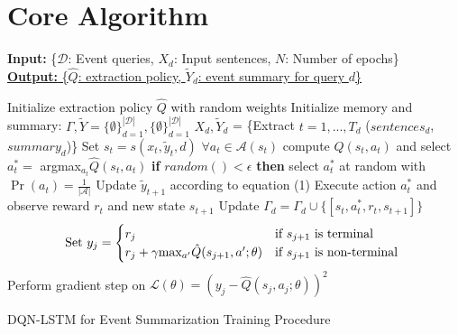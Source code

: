 \documentclass[]{beamer}
\begin{document}
\section{Core Algorithm}
\begin{frame}
\begin{algorithm}[H]
  \tiny
        \textbf{Input:} { \rm  \{$\mathcal{D}$: Event queries, $X_d$: Input sentences, $N$: Number of epochs\} } \\
        \underline{\textbf{Output:} \rm \{$\hat{Q}$: extraction policy, $\tilde{Y}_d$: event summary for query $d$\} }
\begin{algorithmic}[1]
    \STATE \rm Initialize extraction policy $\hat{Q}$ with random weights
    \STATE \rm Initialize memory and summary: $\Gamma, \tilde{Y} =  \{\emptyset \}^{\mathcal{|D|}}_{d=1},  \{\emptyset \}^{\mathcal{|D|}}_{d=1} $
            \STATE $X_{d}, \tilde{Y}_{d}$ = \{Extract $t=1,...,T_d$ ($sentences_d$, $summary_d$)\}
                \STATE Set $s_t = s(x_t, \tilde{y}_t, d)$
                \STATE $ \forall a_t \in \mathcal{A}(s_t)$ \textrm{compute} $\hat{Q}(s_t, a_t)$ and select $a^{*}_t =$ argmax$_{a_{t}}\hat{Q}(s_t, a_t)$
                \STATE  \textbf{if} $random() < \epsilon$ \textbf{then} select $a^{*}_t $ at random with $\Pr(a_t) =\frac{1}{| \mathcal{A} |} $
                \STATE Update $\tilde{y}_{t+1}$ according to equation (1)
                \STATE Execute action $a^{*}_t$ and observe reward $r_t$ and new state $s_{t+1}$
                \STATE Update $\Gamma_d = \Gamma_d \cup \{ [s_t, a^{*}_t, r_t, s_{t+1}]\}$
            \ENDFOR
        \ENDFOR
                \STATE \[\textrm{Set } y_j =
                        \begin{cases}
                            r_j                                             & \text{if $s_{j+1}$ is terminal } \\
                                r_j + \gamma $max$_{a'}\hat{Q}(s_{j+1}, a'; \theta)     & \text{if $s_{j+1}$ is non-terminal } 
                        \end{cases} 
                        \]
                        \STATE Perform gradient step on $\mathcal{L}(\theta) = (y_j - \hat{Q}(s_j, a_j; \theta))^2$
            \ENDFOR
    \ENDFOR
\end{algorithmic}
\caption*{ DQN-LSTM for Event Summarization Training Procedure}
\label{alg:seq}
\end{algorithm}
\end{frame}
\end{document}
